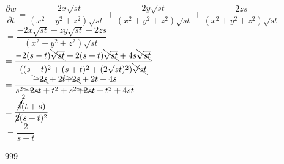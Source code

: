 \documentclass[a4paper]{article}
\begin{document}
\medskip

$\dfrac{\partial w}{\partial t} = \dfrac{-2x\sqrt{st}}{(x^2 + y^2 + z^2)\sqrt{st}} + \dfrac{2y\sqrt{st}}{(x^2 + y^2 + z^2)\sqrt{st}} + \dfrac{2zs}{(x^2 + y^2 + z^2)\sqrt{st}}$ \\

$= \dfrac{-2x\sqrt{st} + zy\sqrt{st} + 2zs}{(x^2 + y^2 + z^2)\sqrt{st}}$ \\

$= \dfrac{-2(s-t)\bcancel{\sqrt{st}} +2(s+t)\bcancel{\sqrt{st}}+4s\bcancel{\sqrt{st}}}{((s-t)^2+(s+t)^2 +(2\sqrt{st})^2)\bcancel{\sqrt{st}}}$ \\

$=\dfrac{\bcancel{-2s} + 2t \bcancel{+ 2s} + 2t + 4s}{s^2 \bcancel{-2st} + t^2 + s^2 \bcancel{+ 2st} + t^2 + 4st}$ \\

$= \dfrac{\cancelto{2}{4}(t+s)}{\cancel{2}(s+t)^2}$ \\

$= \dfrac{2}{s+t}$ \\

\begin{thebibliography}{999}
\end{thebibliography}
\end{document}
